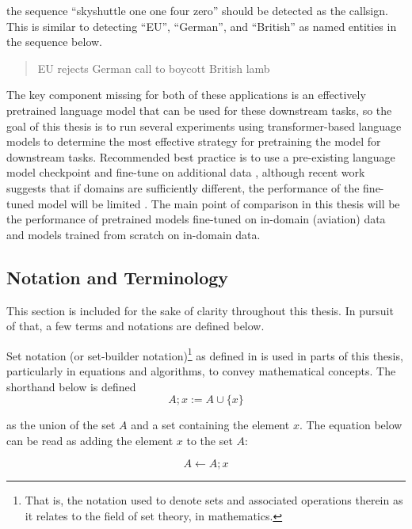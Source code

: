 \documentclass[12pt]{article}
\begin{document}
\noindent
the sequence ``skyshuttle one one four zero'' should be detected as the callsign. This is similar to detecting ``EU'', ``German'', and ``British'' as
named entities in the sequence below.

\begin{quote}
    EU rejects German call to boycott British lamb
\end{quote}

The key component missing for both of these applications is an effectively pretrained language model that can be used for these downstream tasks, so
the goal of this thesis is to run several experiments using transformer-based language models to determine the most effective strategy for pretraining
the model for downstream tasks. Recommended best practice is to use a pre-existing language model checkpoint and fine-tune on additional data
\cite{devlin_bert_2019,liu_roberta_2019,lewis_bart_2019}, although recent work suggests that if domains are sufficiently different, the performance
of the fine-tuned model will be limited \cite{yadlowsky_pretraining_2023}. The main point of comparison in this thesis will be the performance of
pretrained models fine-tuned on in-domain (aviation) data and models trained from scratch on in-domain data.

\subsection{Notation and Terminology}
This section is included for the sake of clarity throughout this thesis. In pursuit of that, a few terms and notations are defined below.

Set notation (or set-builder notation)\footnote{That is, the notation used to denote sets and associated operations therein as it relates to the field
    of set theory, in mathematics.} as defined in \cite{jech_chapter_1978} is used in parts of this thesis, particularly in equations and algorithms,
to convey mathematical concepts. The shorthand below is defined
\begin{equation*}
    A; x := A \cup \{x\}
\end{equation*}

\noindent
as the union of the set $A$ and a set containing the element $x$. The equation below can be read as adding the element $x$ to the set $A$:

\begin{equation*}
    A \leftarrow A; x
\end{equation*}
\end{document}
